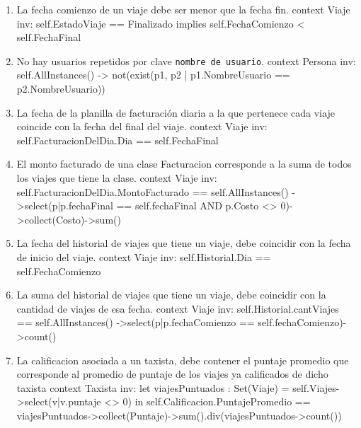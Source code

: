 \begin{enumerate}
	\item \begin{ocl}{La fecha comienzo de un viaje debe ser menor que la fecha fin.}
		  context Viaje
		  inv: self.EstadoViaje == Finalizado implies 
		  self.FechaComienzo < self.FechaFinal
		\end{ocl}

	\item \begin{ocl}{No hay usuarios repetidos por clave \texttt{nombre de usuario}.}
		  context Persona
		  inv: self.AllInstances() -> not(exist(p1, p2 | p1.NombreUsuario == p2.NombreUsuario))
		\end{ocl}	

	\item \begin{ocl}{La fecha de la planilla de facturaci\'on diaria a la que pertenece cada viaje coincide con la fecha del final del viaje.}
		  context Viaje
		  inv: self.FacturacionDelDia.Dia == self.FechaFinal
		\end{ocl}

	\item \begin{ocl}{El monto facturado de una clase Facturacion corresponde a la suma de todos los viajes que tiene la clase.}
		  context Viaje
		  inv: self.FacturacionDelDia.MontoFacturado == self.AllInstances()
		  ->select(p|p.fechaFinal == self.fechaFinal AND p.Costo <> 0)->collect(Costo)->sum()
		\end{ocl}
		

	\item \begin{ocl}{La fecha del historial de viajes que tiene un viaje, debe coincidir con la fecha de inicio del viaje.}
		  context Viaje
		  inv: self.Historial.Dia == self.FechaComienzo
		\end{ocl}

			\item \begin{ocl}{La suma del historial de viajes que tiene un viaje, debe coincidir con la cantidad de viajes de esa fecha.}
		  context Viaje
		  inv: self.Historial.cantViajes == self.AllInstances()
		  ->select(p|p.fechaComienzo == self.fechaComienzo)->count()
		\end{ocl}


	\item \begin{ocl}{La calificacion asociada a un taxista, debe contener el puntaje promedio que corresponde al promedio de puntaje de los viajes ya calificados de dicho taxista}
		  context Taxista
		  inv: let viajesPuntuados : Set(Viaje) = self.Viajes->select(v|v.puntaje <> 0) in
		  self.Calificacion.PuntajePromedio == 
		  viajesPuntuados->collect(Puntaje)->sum().div(viajesPuntuados->count())
		\end{ocl}
		

\end{enumerate}
